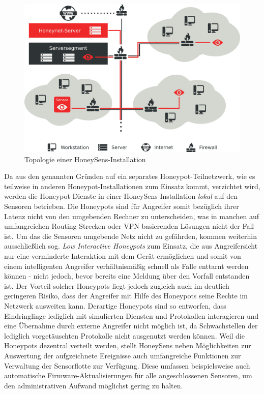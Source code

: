 \documentclass[12pt]{article}
\begin{document}
\begin{figure}[h]
				\centering
				\includegraphics[scale=0.8]{./graphics/topologie.png}
				\caption{Topologie einer HoneySens-Installation}
				\label{fig:topology}
\end{figure}

Da aus den genannten Gründen auf ein separates Honeypot-Teilnetzwerk, wie es teilweise in anderen Honeypot-Installationen zum Einsatz kommt, verzichtet wird, werden die Honeypot-Dienste in einer HoneySens-Installation \textit{lokal} auf den Sensoren betrieben. Die Honeypots sind für Angreifer somit bezüglich ihrer Latenz nicht von den umgebenden Rechner zu unterscheiden, was in manchen auf umfangreichen Routing-Strecken oder VPN basierenden Lösungen nicht der Fall ist. Um das die Sensoren umgebende Netz nicht zu gefährden, kommen weiterhin ausschließlich sog. \textit{Low Interactive Honeypots} zum Einsatz, die aus Angreifersicht nur eine verminderte Interaktion mit dem Gerät ermöglichen und somit von einem intelligenten Angreifer verhältnismäßig schnell als Falle enttarnt werden können - nicht jedoch, bevor bereits eine Meldung über den Vorfall entstanden ist. Der Vorteil solcher Honeypots liegt jedoch zugleich auch im deutlich geringeren Risiko, dass der Angreifer mit Hilfe des Honeypots seine Rechte im Netzwerk ausweiten kann. Derartige Honeypots sind so entworfen, dass Eindringlinge lediglich mit simulierten Diensten und Protokollen interagieren und eine Übernahme durch externe Angreifer nicht möglich ist, da Schwachstellen der lediglich vorgetäuschten Protokolle nicht ausgenutzt werden können. Weil die Honeypots dezentral verteilt werden, stellt HoneySens neben Möglichkeiten zur Auswertung der aufgzeichnete Ereignisse auch umfangreiche Funktionen zur Verwaltung der Sensorflotte zur Verfügung. Diese umfassen beispielsweise auch automatische Firmware-Aktualisierungen für alle angeschlossenen Sensoren, um den administrativen Aufwand möglichst gering zu halten.
\end{document}
